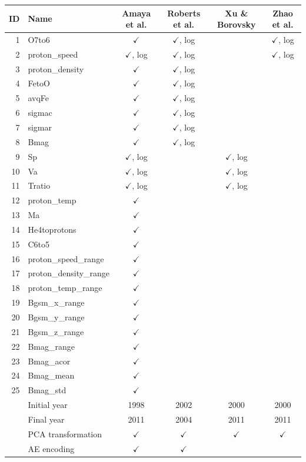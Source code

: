 \documentclass[utf8]{frontiersSCNS} %
\begin{document}
\begin{table}\centering
	\begin{tabular}{@{}rlcccc@{}}
		\toprule
		ID & Name  & Amaya et al. & Roberts et al. & Xu \& Borovsky & Zhao et al. \\
		\midrule
		1 & O7to6 & $\checkmark$ & $\checkmark$, log & & $\checkmark$, log \\
		2 & proton\_speed & $\checkmark$, log & $\checkmark$, log & & $\checkmark$, log \\
		3 & proton\_density & $\checkmark$ & $\checkmark$, log & & \\
		4 & FetoO & $\checkmark$ & $\checkmark$, log & & \\
		5 & avqFe & $\checkmark$ & $\checkmark$, log & & \\
		6 & sigmac & $\checkmark$ & $\checkmark$, log & & \\
		7 & sigmar & $\checkmark$ & $\checkmark$, log & & \\
		8 & Bmag & $\checkmark$ & $\checkmark$, log & & \\
		9 & Sp & $\checkmark$, log & & $\checkmark$, log & \\
		10 & Va & $\checkmark$, log & &$\checkmark$, log & \\
		11 & Tratio & $\checkmark$, log & & $\checkmark$, log & \\
		12 & proton\_temp & $\checkmark$ & & & \\
		13 & Ma & $\checkmark$ & & & \\
		14 & He4toprotons & $\checkmark$ & & & \\
		15 & C6to5 & $\checkmark$ & & & \\
		16 & proton\_speed\_range & $\checkmark$ & & & \\
		17 & proton\_density\_range & $\checkmark$ & & & \\
		18 & proton\_temp\_range & $\checkmark$ & & & \\
		19 & Bgsm\_x\_range & $\checkmark$ & & & \\
		20 & Bgsm\_y\_range & $\checkmark$ & & & \\
		21 & Bgsm\_z\_range & $\checkmark$ & & & \\
		22 & Bmag\_range & $\checkmark$ & & & \\
		23 & Bmag\_acor & $\checkmark$ & & & \\
		24 & Bmag\_mean & $\checkmark$ & & & \\
		25 & Bmag\_std & $\checkmark$ & & & \\
		\midrule
		 & Initial year & 1998 & 2002 & 2000 & 2000 \\
		 & Final year & 2011 & 2004 & 2011 & 2011 \\
		 & PCA transformation & $\checkmark$ & $\checkmark$ & $\checkmark$ & $\checkmark$ \\
		 & AE encoding & $\checkmark$ & $\checkmark$ & & \\
		\bottomrule
	\end{tabular}
\end{table}
\end{document}
